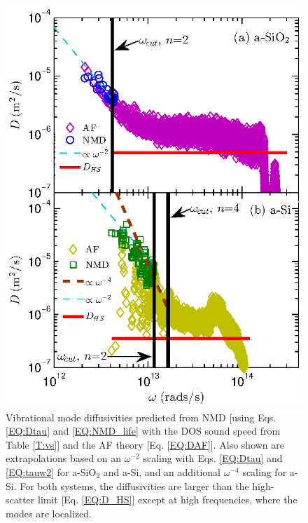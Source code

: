 \documentclass[aps,prb,twocolumn,superscriptaddress,footinbib,amsmath,amssymb,floatfix]{revtex4}
\begin{document}
\begin{figure}
\begin{center}
\includegraphics[scale=1.0]
{fig5.eps}
\vspace*{-5mm}
\end{center}
\caption{\label{FIG:diffusivities} Vibrational mode diffusivities 
predicted from NMD [using Eqs. \eqref{EQ:Dtau} and 
\eqref{EQ:NMD_life} with the DOS sound speed from Table \ref{T:vs}] 
and the AF theory [Eq. \eqref{EQ:DAF}]. 
Also shown are  
extrapolations based on an $\omega^{-2}$ scaling with 
Eqs. \eqref{EQ:Dtau} and \eqref{EQ:tauw2} for a-SiO$_2$ and a-Si, 
and an additional $\omega^{-4}$ scaling for a-Si. For both systems, 
the diffusivities are larger than the high-scatter limit 
[Eq. \eqref{EQ:D_HS}] except at high frequencies, where the modes 
are localized.
}
\end{figure}
\end{document}
